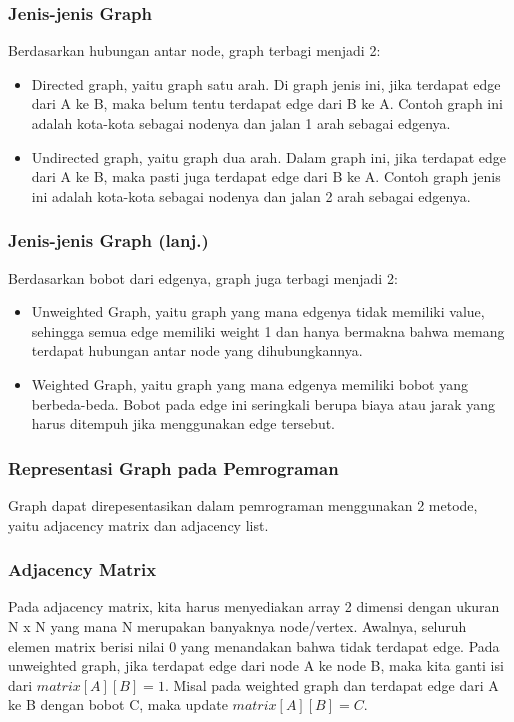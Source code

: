\begin{frame}
\frametitle{Jenis-jenis Graph}
Berdasarkan hubungan antar node, graph terbagi menjadi 2:
\begin{itemize}
	\item Directed graph, yaitu graph satu arah. Di graph jenis ini, jika terdapat edge dari A ke B, maka belum tentu terdapat edge dari B ke A. Contoh graph ini adalah kota-kota sebagai nodenya dan jalan 1 arah sebagai edgenya.
	\item Undirected graph, yaitu graph dua arah. Dalam graph ini, jika terdapat edge dari A ke B, maka pasti juga terdapat edge dari B ke A. Contoh graph jenis ini adalah kota-kota sebagai nodenya dan jalan 2 arah sebagai edgenya.
\end{itemize}
\end{frame}

\begin{frame}
\frametitle{Jenis-jenis Graph (lanj.)}
Berdasarkan bobot dari edgenya, graph juga terbagi menjadi 2:
\begin{itemize}
	\item Unweighted Graph, yaitu graph yang mana edgenya tidak memiliki value, sehingga semua edge memiliki weight 1 dan hanya bermakna bahwa memang terdapat hubungan antar node yang dihubungkannya.
	\item Weighted Graph, yaitu graph yang mana edgenya memiliki bobot yang berbeda-beda. Bobot pada edge ini seringkali berupa biaya atau jarak yang harus ditempuh jika menggunakan edge tersebut.
\end{itemize}
\end{frame}

\begin{frame}
\frametitle{Representasi Graph pada Pemrograman}

Graph dapat direpesentasikan dalam pemrograman menggunakan 2 metode, yaitu adjacency matrix dan adjacency list.
\end{frame}

\begin{frame}
\frametitle{Adjacency Matrix}

Pada adjacency matrix, kita harus menyediakan array 2 dimensi dengan ukuran N x N yang mana N merupakan banyaknya node/vertex. \newline\newline
Awalnya, seluruh elemen matrix berisi nilai 0 yang menandakan bahwa tidak terdapat edge. Pada unweighted graph, jika terdapat edge dari node A ke node B, maka kita ganti isi dari $matrix[A][B] = 1$. Misal pada weighted graph dan terdapat edge dari A ke B dengan bobot C, maka update $matrix[A][B] = C$.
\end{frame}

